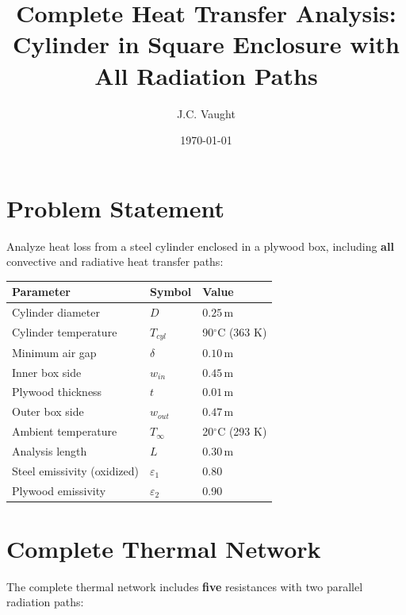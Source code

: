 \documentclass[11pt]{article}
\title{\textbf{Complete Heat Transfer Analysis:\\Cylinder in Square Enclosure with All Radiation Paths}}
\author{J.C. Vaught}
\date{\today}
\newcommand{\degC}{$^\circ$C}
\newcommand{\unit}[1]{\,\mathrm{#1}}
\begin{document}
\maketitle

\section{Problem Statement}

Analyze heat loss from a steel cylinder enclosed in a plywood box, including \textbf{all} convective and radiative heat transfer paths:

\begin{table}[H]
\centering
\begin{tabular}{lll}
\toprule
\textbf{Parameter} & \textbf{Symbol} & \textbf{Value} \\
\midrule
Cylinder diameter & $D$ & $0.25\unit{m}$ \\
Cylinder temperature & $T_{cyl}$ & 90\degC{} (363 K) \\
Minimum air gap & $\delta$ & $0.10\unit{m}$ \\
Inner box side & $w_{in}$ & $0.45\unit{m}$ \\
Plywood thickness & $t$ & $0.01\unit{m}$ \\
Outer box side & $w_{out}$ & $0.47\unit{m}$ \\
Ambient temperature & $T_\infty$ & 20\degC{} (293 K) \\
Analysis length & $L$ & $0.30\unit{m}$ \\
\midrule
Steel emissivity (oxidized) & $\varepsilon_1$ & 0.80 \\
Plywood emissivity & $\varepsilon_2$ & 0.90 \\
\bottomrule
\end{tabular}
\end{table}

\section{Complete Thermal Network}

The complete thermal network includes \textbf{five} resistances with two parallel radiation paths:
\end{document}
